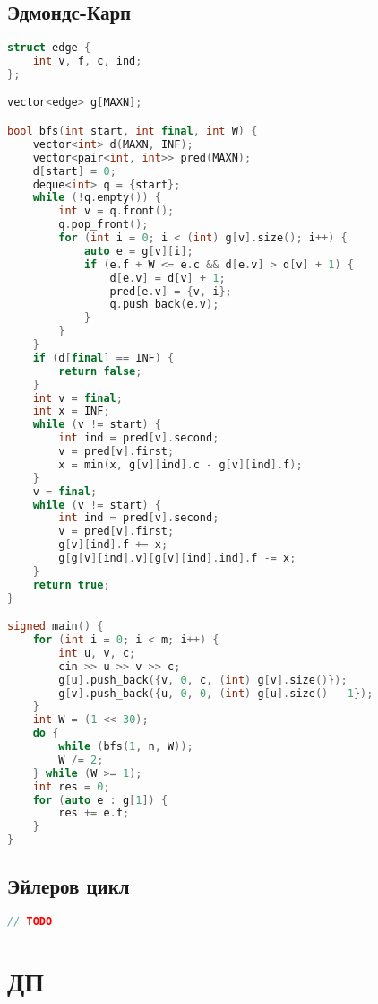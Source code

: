 \documentclass[10pt,a4paper,landscape,twosided]{extarticle}
\begin{document}
\begin{multicols*}{3}
\begin{lstlisting}[language=C++]
\end{lstlisting}

\subsection{Эдмондс-Карп}
\begin{lstlisting}[language=C++]
struct edge {
    int v, f, c, ind;
};

vector<edge> g[MAXN];

bool bfs(int start, int final, int W) {
    vector<int> d(MAXN, INF);
    vector<pair<int, int>> pred(MAXN);
    d[start] = 0;
    deque<int> q = {start};
    while (!q.empty()) {
        int v = q.front();
        q.pop_front();
        for (int i = 0; i < (int) g[v].size(); i++) {
            auto e = g[v][i];
            if (e.f + W <= e.c && d[e.v] > d[v] + 1) {
                d[e.v] = d[v] + 1;
                pred[e.v] = {v, i};
                q.push_back(e.v);
            }
        }
    }
    if (d[final] == INF) {
        return false;
    }
    int v = final;
    int x = INF;
    while (v != start) {
        int ind = pred[v].second;
        v = pred[v].first;
        x = min(x, g[v][ind].c - g[v][ind].f);
    }
    v = final;
    while (v != start) {
        int ind = pred[v].second;
        v = pred[v].first;
        g[v][ind].f += x;
        g[g[v][ind].v][g[v][ind].ind].f -= x;
    }
    return true;
}

signed main() {
    for (int i = 0; i < m; i++) {
        int u, v, c;
        cin >> u >> v >> c;
        g[u].push_back({v, 0, c, (int) g[v].size()});
        g[v].push_back({u, 0, 0, (int) g[u].size() - 1});
    }
    int W = (1 << 30);
    do {
        while (bfs(1, n, W));
        W /= 2;
    } while (W >= 1);
    int res = 0;
    for (auto e : g[1]) {
        res += e.f;
    }
}

\end{lstlisting}

\subsection{Эйлеров цикл}
\begin{lstlisting}[language=C++]
// TODO

\end{lstlisting}

\section{ДП}


\end{multicols*}
\end{document}
